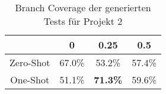 \bgroup
\def\arraystretch{2}
\begin{table}[H]
	\vspace{.5cm}
	\centering		
	\begin{center}
		\begin{tabular}{|c||c|c|c|}
			\hline 
			& 0 & 0.25 & 0.5 \\
			\hline 
			\hline
			Zero-Shot & 67.0\% & 53.2\% & 57.4\% \\
			\hline
			One-Shot & 51.1\% & \textbf{71.3\%} & 59.6\% \\
			\hline
		\end{tabular} 
	\end{center}
	\caption{Branch Coverage der generierten Tests für Projekt 2}
	\label{fig:branch-2}
	\vspace{-.8cm}
\end{table}
\egroup
